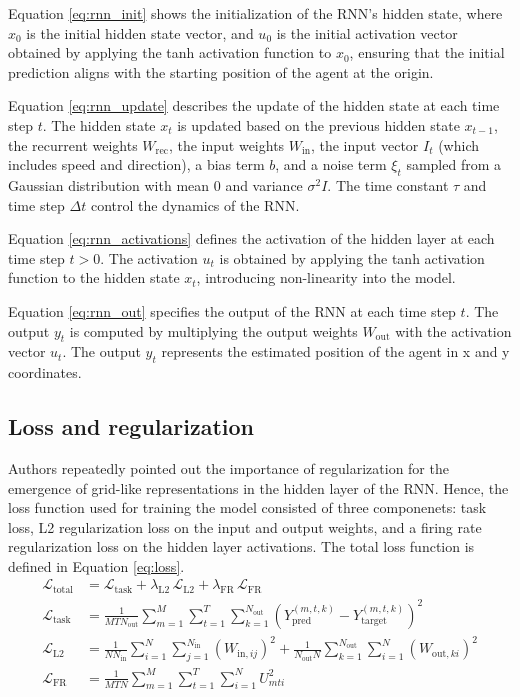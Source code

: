 \documentclass{article}
\begin{document}
Equation \ref{eq:rnn_init} shows the initialization of the RNN's hidden state, where $x_0$ is the initial hidden state vector, and $u_0$ is the initial activation vector obtained by applying the tanh activation function to $x_0$, ensuring that the initial prediction aligns with the starting position of the agent at the origin.

Equation \ref{eq:rnn_update} describes the update of the hidden state at each time step $t$. The hidden state $x_t$ is updated based on the previous hidden state $x_{t-1}$, the recurrent weights $W_{\mathrm{rec}}$, the input weights $W_{\mathrm{in}}$, the input vector $I_t$ (which includes speed and direction), a bias term $b$, and a noise term $\xi_t$ sampled from a Gaussian distribution with mean 0 and variance $\sigma^2 I$. The time constant $\tau$ and time step $\Delta t$ control the dynamics of the RNN.

Equation \ref{eq:rnn_activations} defines the activation of the hidden layer at each time step $t>0$. The activation $u_t$ is obtained by applying the tanh activation function to the hidden state $x_t$, introducing non-linearity into the model.

Equation \ref{eq:rnn_out} specifies the output of the RNN at each time step $t$. The output $y_t$ is computed by multiplying the output weights $W_{\mathrm{out}}$ with the activation vector $u_t$. The output $y_t$ represents the estimated position of the agent in x and y coordinates.



\subsection{Loss and regularization}
Authors repeatedly pointed out the importance of regularization for the emergence of grid-like representations in the hidden layer of the RNN. Hence, the loss function used for training the model consisted of three componenets: task loss, L2 regularization loss on the input and output weights, and a firing rate regularization loss on the hidden layer activations. The total loss function is defined in Equation \ref{eq:loss}.
\[
\begin{aligned}
\mathcal{L}_{\text{total}} 
&= \mathcal{L}_{\text{task}} 
   + \lambda_{\text{L2}} \, \mathcal{L}_{\text{L2}} 
   + \lambda_{\text{FR}} \, \mathcal{L}_{\text{FR}} \\[6pt]
\mathcal{L}_{\text{task}} 
&= \frac{1}{M T N_{\text{out}}} 
   \sum_{m=1}^{M} \sum_{t=1}^{T} \sum_{k=1}^{N_{\text{out}}}
   \left( Y_{\text{pred}}^{(m,t,k)} - Y_{\text{target}}^{(m,t,k)} \right)^2 \\[6pt]
\mathcal{L}_{\text{L2}} 
&= \frac{1}{N N_{\text{in}}} \sum_{i=1}^{N} \sum_{j=1}^{N_{\text{in}}} 
   (W_{\text{in},ij})^2
   + \frac{1}{N_{\text{out}} N} \sum_{k=1}^{N_{\text{out}}} \sum_{i=1}^{N}
   (W_{\text{out},ki})^2 \\[6pt]
\mathcal{L}_{\text{FR}} 
&= \frac{1}{M T N} \sum_{m=1}^{M} \sum_{t=1}^{T} \sum_{i=1}^{N} 
   U_{mti}^2
\label{eq:loss}
\end{aligned}
\]
\end{document}
